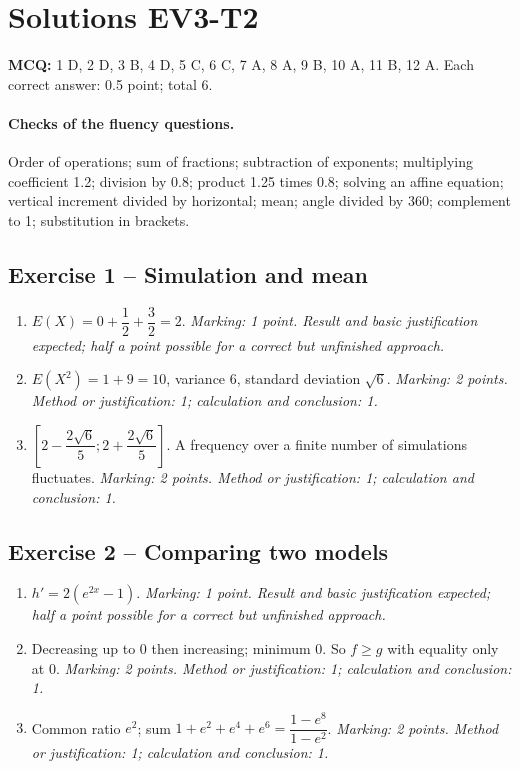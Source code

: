 \clearpage\section*{Solutions EV3-T2}\label{EV3-T2-CORR}
\textbf{MCQ:} 1 D, 2 D, 3 B, 4 D, 5 C, 6 C, 7 A, 8 A, 9 B, 10 A, 11 B, 12 A. Each correct answer: 0.5 point; total 6.
\paragraph{Checks of the fluency questions.} Order of operations; sum of fractions; subtraction of exponents; multiplying coefficient 1.2; division by 0.8; product 1.25 times 0.8; solving an affine equation; vertical increment divided by horizontal; mean; angle divided by 360; complement to 1; substitution in brackets.
\subsection*{Exercise 1 -- Simulation and mean}
\begin{enumerate}
\item $E(X)=0+\dfrac{1}{2}+\dfrac{3}{2}=2$. \textit{Marking: 1 point. Result and basic justification expected; half a point possible for a correct but unfinished approach.}
\item $E(X^2)=1+9=10$, variance 6, standard deviation $\sqrt6$. \textit{Marking: 2 points. Method or justification: 1; calculation and conclusion: 1.}
\item $[2-\dfrac{2\sqrt 6}{5};2+\dfrac{2\sqrt 6}{5}]$. A frequency over a finite number of simulations fluctuates. \textit{Marking: 2 points. Method or justification: 1; calculation and conclusion: 1.}
\end{enumerate}
\subsection*{Exercise 2 -- Comparing two models}
\begin{enumerate}
\item $h\prime=2(e^{2x}-1)$. \textit{Marking: 1 point. Result and basic justification expected; half a point possible for a correct but unfinished approach.}
\item Decreasing up to 0 then increasing; minimum 0. So $f\geq g$ with equality only at 0. \textit{Marking: 2 points. Method or justification: 1; calculation and conclusion: 1.}
\item Common ratio $e^2$; sum $1+e^2+e^4+e^6=\dfrac{1-e^8}{1-e^2}$. \textit{Marking: 2 points. Method or justification: 1; calculation and conclusion: 1.}
\end{enumerate}
